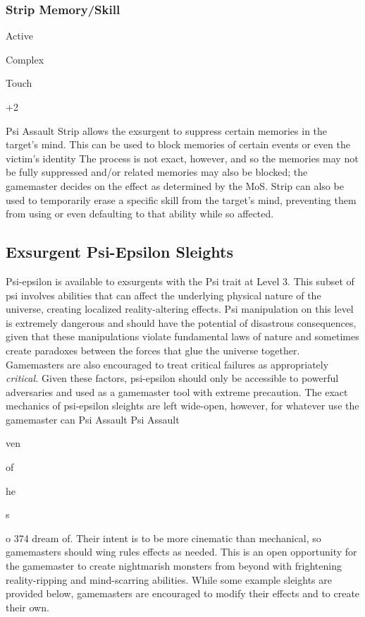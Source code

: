 \subsubsection{Strip Memory/Skill }


  

Active

   Complex

 Touch

  

  

+2

  

Psi Assault
Strip allows the exsurgent to suppress certain memories
in the target's mind. This can be used to block
memories of certain events or even the victim's identity
The process is not exact, however, and so the
memories may not be fully suppressed and/or related 
memories may also be blocked; the gamemaster decides
on the effect as determined by the MoS. Strip can
also be used to temporarily erase a specific skill from 
the target's mind, preventing them from using or even 
defaulting to that ability while so affected.

\subsection{Exsurgent Psi-Epsilon Sleights }

Psi-epsilon is available to exsurgents with the Psi trait 
at Level 3. This subset of psi involves abilities that can 
affect the underlying physical nature of the universe, 
creating localized reality-altering effects. Psi manipulation
on this level is extremely dangerous and should
have the potential of disastrous consequences, given 
that these manipulations violate fundamental laws of 
nature and sometimes create paradoxes between the 
forces that glue the universe together. Gamemasters 
are also encouraged to treat critical failures as appropriately
\textit{critical.}
Given these factors, psi-epsilon should only be 
accessible to powerful adversaries and used as a 
gamemaster tool with extreme precaution. The exact 
mechanics of psi-epsilon sleights are left wide-open, 
however, for whatever use the gamemaster can 
Psi Assault
Psi Assault

ven 

of 

he 

s

o
374
dream of. Their intent is to be more cinematic than 
mechanical, so gamemasters should wing rules effects 
as needed. This is an open opportunity for the gamemaster
to create nightmarish monsters from beyond
with frightening reality-ripping and mind-scarring 
abilities. While some example sleights are provided 
below, gamemasters are encouraged to modify their 
effects and to create their own. 

